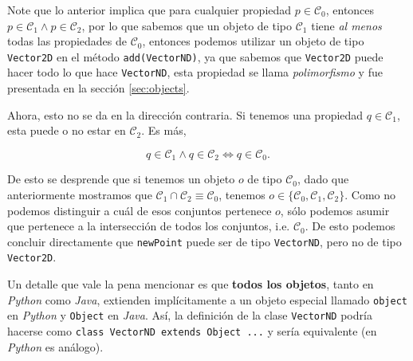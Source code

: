   Note que lo anterior implica que para cualquier propiedad \(p \in \mathcal{C}_0\), 
  entonces \(p \in \mathcal{C}_1 \wedge p \in \mathcal{C}_2\), por lo que sabemos que un 
  objeto de tipo \(\mathcal{C}_1\) tiene \textit{al menos} todas las propiedades de 
  \(\mathcal{C}_0\), entonces podemos utilizar un objeto de tipo \texttt{Vector2D} en el 
  método \texttt{add(VectorND)}, ya que sabemos que \texttt{Vector2D} puede 
  hacer todo lo que hace \texttt{VectorND}, esta propiedad se llama \textit{polimorfismo}
  y fue presentada en la sección \ref{sec:objects}.

  Ahora, esto no se da en la dirección contraria. 
  Si tenemos una propiedad \(q \in \mathcal{C}_1\), esta puede o no estar en 
  \(\mathcal{C}_2\).
  Es más, 
  
  \[  q \in \mathcal{C}_1 \wedge q \in \mathcal{C}_2 \iff q \in \mathcal{C}_0.  \]
  
  De esto se desprende que si tenemos un objeto \(o\) de tipo \(\mathcal{C}_0\), dado que 
  anteriormente mostramos que \(\mathcal{C}_1 \cap \mathcal{C}_2 \equiv \mathcal{C}_0\), 
  tenemos \(o \in \{\mathcal{C}_0, \mathcal{C}_1, \mathcal{C}_2\}\).
  Como no podemos distinguir a cuál de esos conjuntos pertenece \(o\), sólo podemos asumir
  que pertenece a la intersección de todos los conjuntos, i.e. \(\mathcal{C}_0\).
  De esto podemos concluir directamente que \texttt{newPoint} puede ser de tipo 
  \texttt{VectorND}, pero no de tipo \texttt{Vector2D}.

  \begin{note}
    Un detalle que vale la pena mencionar es que \textbf{todos los objetos}, tanto en 
    \textit{Python} como \textit{Java}, extienden implícitamente a un objeto especial 
    llamado \texttt{object} en \textit{Python} y \texttt{Object} en \textit{Java}.
    Así, la definición de la clase \texttt{VectorND} podría hacerse como 
    \texttt{class VectorND extends Object {...}} y sería equivalente 
    (en \textit{Python} es análogo).
  \end{note}
%